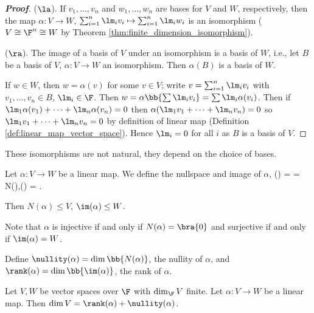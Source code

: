 \begin{proof}[\bf Proof]
($\la$). If $v_1, \dots, v_n$ and $w_1, \dots,w_n$ are bases for $V$ and $W$, respectively, then the map $\alpha : V \to W$, $\sum^n_{i=1} \lm_iv_i \mapsto \sum^n_{i=1} \lm_iw_i$ is an isomorphism ($V \cong \F^n \cong W$ by Theorem \ref{thm:finite_dimension_isomorphism}).

($\ra$). The image of a basis of $V$ under an isomorphism is a basis of $W$, i.e., let $B$ be a basis of $V$, $\alpha : V \to W$ an isomorphism. Then $\alpha(B)$ is a basis of $W$.

If $w \in W$, then $w = \alpha(v)$ for some $v \in V$; write $v = \sum^n_{i=1} \lm_iv_i$ with $v_1, \dots, v_n \in B$, $\lm_i \in \F$. Then $w = \alpha\bb{\sum \lm_iv_i} = \sum \lm_i\alpha(v_i)$. Then if $\lm_1\alpha(v_1)+\dots+\lm_n\alpha(v_n) = 0$ then $\alpha(\lm_1v_1+\dots+\lm_nv_n) = 0$ so $\lm_1v_1+\dots+\lm_nv_n = 0$ by definition of linear map (Definition \ref{def:linear_map_vector_space}). %
Hence $\lm_i = 0$ for all $i$ as $B$ is a basis of $V$.%
\end{proof}

\begin{remark}
These isomorphisms are not natural, they depend on the choice of bases.
\end{remark}

\begin{definition}\label{def:nullspace_nullity}
Let $\alpha : V \to W$ be a linear map. We define the nullspace and image of $\alpha$,
\be
\ker(\alpha) =  = N(\alpha),\qquad \im(\alpha) = .
\ee

Then $N(\alpha) \leq  V$, $\im(\alpha) \leq  W$.

Note that $\alpha$ is injective if and only if $N(\alpha) = \bra{0}$ and surjective if and only if $\im(\alpha) = W$.

Define $\nullity(\alpha) = \dim \bb{N(\alpha)}$, the nullity of $\alpha$, and $\rank(\alpha) = \dim \bb{\im(\alpha)}$, the rank of $\alpha$.
\end{definition}

\begin{theorem}\label{thm:rank_nullity}
Let $V , W$ be vector spaces over $\F$ with $\dim_\F V$ finite. Let $\alpha : V \to W$ be a linear map. Then $\dim V = \rank(\alpha) + \nullity(\alpha)$.
\end{theorem}

